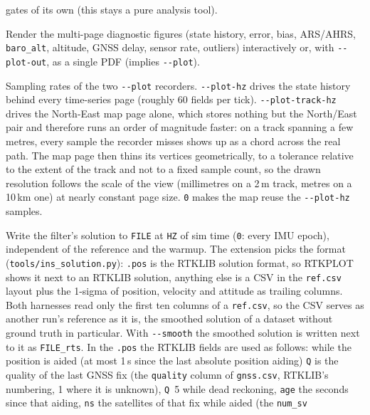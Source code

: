 \documentclass[11pt,a4paper]{article}
\newcommand{\code}[1]{\texttt{#1}}
\begin{document}
\begin{description}
        gates of its own (this stays a pure analysis tool).
  \item[\code{-{}-plot}, \code{-{}-plot-out PATH}] Render the multi-page
    diagnostic figures (state history, error, bias,
    ARS/AHRS, \code{baro\_\allowbreak{}alt}, altitude, GNSS delay, sensor rate, outliers)
    interactively or, with \code{-{}-plot-out}, as a single PDF (implies
    \code{-{}-plot}).
  \item[\code{-{}-plot-hz HZ}, \code{-{}-plot-track-hz HZ}] Sampling rates of
    the two \code{-{}-plot} recorders. \code{-{}-plot-hz} drives the state
    history behind every time-series page (roughly 60 fields per tick).
    \code{-{}-plot-track-hz} drives the North-East map page alone, which
    stores nothing but the North/East pair and therefore runs an order of
    magnitude faster: on a track spanning a few metres, every sample the
    recorder misses shows up as a chord across the real path. The map page
    then thins its vertices geometrically, to a tolerance relative to the
    extent of the track and not to a fixed sample count, so the drawn
    resolution follows the scale of the view (millimetres on a 2\,m track,
    metres on a 10\,km one) at nearly constant page size. \code{0} makes
    the map reuse the \code{-{}-plot-hz} samples.
  \item[\code{-{}-dump-solution FILE}, \code{-{}-dump-solution-hz HZ}] Write
    the filter's solution to \code{FILE} at \code{HZ} of sim time
    (\code{0}: every IMU epoch), independent of the reference and the
    warmup. The extension picks the format
    (\code{tools/\allowbreak{}ins\_\allowbreak{}solution.py}):
    \code{.pos} is the RTKLIB solution format, so RTKPLOT shows it next to
    an RTKLIB solution, anything else is a CSV in the \code{ref.csv}
    layout plus the 1-sigma of position, velocity and attitude as
    trailing columns. Both harnesses read only the first ten columns of a
    \code{ref.csv}, so the CSV serves as another run's reference as it is,
    the smoothed solution of a dataset without ground truth in
    particular. With \code{-{}-smooth} the smoothed solution is written
    next to it as \code{FILE\_rts}. In the \code{.pos} the RTKLIB fields
    are used as follows: while the position is aided (at most 1\,s since
    the last absolute position aiding) \code{Q} is the quality of the last
    GNSS fix (the \code{quality} column of \code{gnss.csv}, RTKLIB's
    numbering, 1 where it is unknown), \code{Q}~5 while dead
    reckoning, \code{age} the seconds since that aiding, \code{ns} the
    satellites of that fix while aided (the \code{num\_\allowbreak{}sv}

\end{description}
\end{document}
